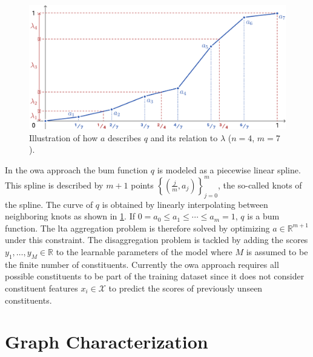 \begin{figure}[ht]
	\centering
	\includegraphics[width=0.75\linewidth]{gfx/related-work/bum.pdf}
	\caption[Illustration of how a \ac{bum} function is described as a linear spline and its relation to the \ac{owa} weights.]{
		Illustration of how \textcolor{t_blue}{$a$} describes \textcolor{t_blue}{$q$} and its relation to \textcolor{t_red}{$\lambda$} ($n = 4$, $m = 7$).
	}\label{fig:related:bum}
\end{figure}
In the \ac{owa} approach the \ac{bum} function $q$ is modeled as a piecewise linear spline.
This spline is described by $m+1$ points ${\left\{ \left( \frac{j}{m}, a_j \right) \right\}}_{j = 0}^{m}$, the so-called knots of the spline. %
The curve of $q$ is obtained by linearly interpolating between neighboring knots as shown in \cref{fig:related:bum}.
If $0 = a_0 \leq a_1 \leq \cdots \leq a_m = 1$, $q$ is a \ac{bum} function.
The \ac{lta} aggregation problem is therefore solved by optimizing $a \in \mathbb{R}^{m + 1}$ under this constraint.
The disaggregation problem is tackled by adding the scores $y_1, \dots, y_M \in \mathbb{R}$ to the learnable parameters of the model where $M$ is assumed to be the finite number of constituents.
Currently the \ac{owa} approach requires all possible constituents to be part of the training dataset since it does not consider constituent features $x_i \in \mathcal{X}$ to predict the scores of previously unseen constituents.

\section{Graph Characterization}%
\label{sec:related:character}

